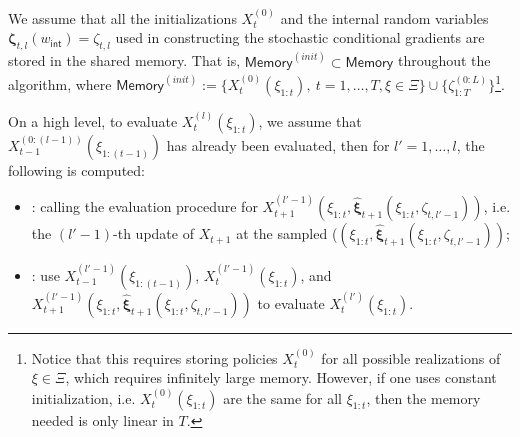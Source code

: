 \documentclass[11pt,fullpage,letterpaper]{article}
\newcommand{\bx}{\boldsymbol{\xi}}
\newcommand{\bz}{\boldsymbol{\zeta}}
\newcommand{\internal}{\mathsf{int}}
\newcommand{\memo}{\mathsf{Memory}}
\begin{document}
We assume that all the initializations $X_t^{(0)}$ and the internal random variables $\bz_{t,l}(w_{\internal}) =\zeta_{t,l} $ used in constructing the stochastic conditional gradients are stored in the shared memory. That is, $\memo^{(init)}\subset \memo$ throughout the algorithm, where
$\memo^{(init)} := \{X_t^{(0)}(\xi_{1:t}),~t=1,\ldots,T, \xi\in \Xi\}\cup \{\zeta_{1:T}^{(0:L)}\}$\footnote{Notice that this requires storing policies $X_t^{(0)}$ for all possible realizations of $\xi\in \Xi$, which requires infinitely large memory. However, if one uses constant initialization, i.e. $X_t^{(0)}(\xi_{1:t})$ are the same for all $\xi_{1:t}$, then the memory needed is only linear in $T$. }. 

On a high level, to evaluate $X_t^{(l)}(\xi_{1:t})$, we assume that $X_{t-1}^{(0:(l-1))}(\xi_{1:(t-1)})$ has already been evaluated, then for $l'=1,\ldots,l$, the following is computed:
\begin{itemize}
    \item {\color{red}{step 1}}: calling the evaluation procedure for $X_{t+1}^{(l'-1)}(\xi_{1:t},\widehat{\bx}_{t+1}(\xi_{1:t},\zeta_{t,l'-1}))$, i.e. the $(l'-1)$-th update of $X_{t+1}$ at the sampled ($(\xi_{1:t},\widehat{\bx}_{t+1}(\xi_{1:t},\zeta_{t,l'-1}))$;
    \item {\color{blue}{step 2}}: use $X_{t-1}^{(l'-1)}(\xi_{1:(t-1)})$, $X_{t}^{(l'-1)}(\xi_{1:t})$, and $X_{t+1}^{(l'-1)}(\xi_{1:t},\widehat{\bx}_{t+1}(\xi_{1:t},\zeta_{t,l'-1}))$ to evaluate $X_t^{(l')}(\xi_{1:t})$.
\end{itemize}
\end{document}
